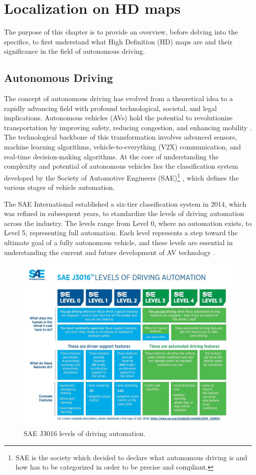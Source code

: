 \NoBgThispage
\chapter{Localization on HD maps}
The purpose of this chapter is to provide an overview, before delving into the specifics, to first understand what High Definition (HD) maps are and their significance in the field of autonomous driving.

\section{Autonomous Driving}
The concept of autonomous driving has evolved from a theoretical idea to a rapidly advancing field with profound technological, societal, and legal implications. Autonomous vehicles (AVs) hold the potential to revolutionize transportation by improving safety, reducing congestion, and enhancing mobility \cite{9695620}. The technological backbone of this transformation involves advanced sensors, machine learning algorithms, vehicle-to-everything (V2X) communication, and real-time decision-making algorithms. At the core of understanding the complexity and potential of autonomous vehicles lies the classification system developed by the Society of Automotive Engineers (SAE)\footnote{SAE is the society which decided to declare what autonomous driving is and how has to be categorized in order to be precise and compliant.} \cite{sae2021}, which defines the various stages of vehicle automation.

The SAE International established a six-tier classification system in 2014, which was refined in subsequent years, to standardize the levels of driving automation across the industry. The levels range from Level 0, where no automation exists, to Level 5, representing full automation. Each level represents a step toward the ultimate goal of a fully autonomous vehicle, and these levels are essential in understanding the current and future development of AV technology \cite{9881892}.

\begin{figure}
    \centering
    \includegraphics[width=1\linewidth]{LateX/figs/ca3qj6bg.png}
    \caption{SAE J3016 levels of driving automation.}
    \label{fig:sae_levels_of_automation}
\end{figure}


